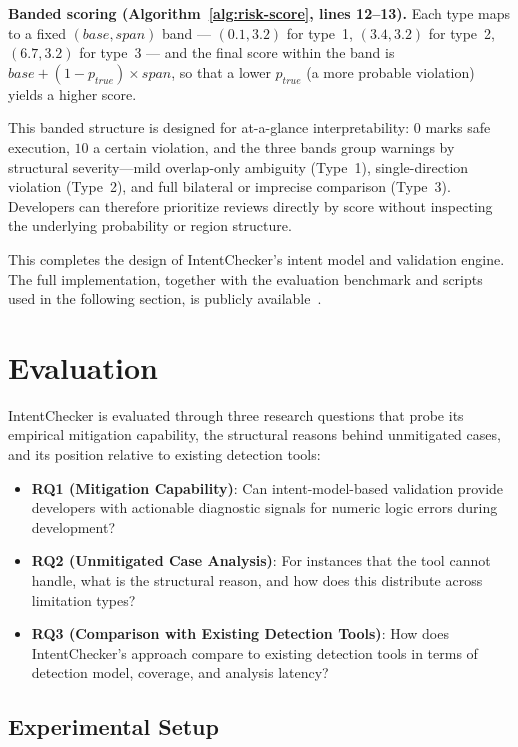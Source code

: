 \documentclass[pdflatex,sn-basic]{sn-jnl}%
\theoremstyle{thmstyleone}%
\theoremstyle{thmstyletwo}%
\theoremstyle{thmstylethree}%
\begin{document}
\smallskip
\textbf{Banded scoring (Algorithm~\ref{alg:risk-score}, lines 12--13).}
Each type maps to a fixed $(\mathit{base}, \mathit{span})$ band --- $(0.1, 3.2)$ for type~1, $(3.4, 3.2)$ for type~2, $(6.7, 3.2)$ for type~3 --- and the final score within the band is $\mathit{base} + (1 - p_{\mathit{true}}) \times \mathit{span}$, so that a lower $p_{\mathit{true}}$ (a more probable violation) yields a higher score.

\smallskip
This banded structure is designed for at-a-glance interpretability: $0$ marks safe execution, $10$ a certain violation, and the three bands group warnings by structural severity---mild overlap-only ambiguity (Type~1), single-direction violation (Type~2), and full bilateral or imprecise comparison (Type~3). Developers can therefore prioritize reviews directly by score without inspecting the underlying probability or region structure.

This completes the design of IntentChecker's intent model and validation engine. The full implementation, together with the evaluation benchmark and scripts used in the following section, is publicly available~\citep{intentchecker}.

\section{Evaluation}\label{sec:evaluation}

IntentChecker is evaluated through three research questions that probe its empirical mitigation capability, the structural reasons behind unmitigated cases, and its position relative to existing detection tools:

\begin{itemize}
    \item \textbf{RQ1 (Mitigation Capability)}: Can intent-model-based validation provide developers with actionable diagnostic signals for numeric logic errors during development?
    \item \textbf{RQ2 (Unmitigated Case Analysis)}: For instances that the tool cannot handle, what is the structural reason, and how does this distribute across limitation types?
    \item \textbf{RQ3 (Comparison with Existing Detection Tools)}: How does IntentChecker's approach compare to existing detection tools in terms of detection model, coverage, and analysis latency?
\end{itemize}

\subsection{Experimental Setup}\label{sec:setup}
\end{document}
